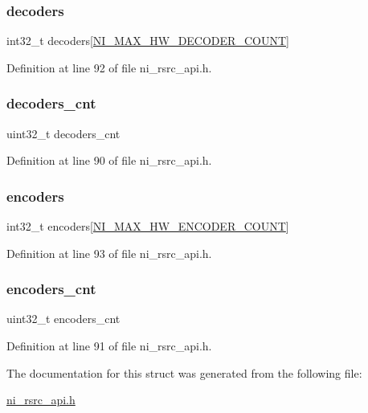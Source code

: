 \subsubsection{\texorpdfstring{decoders}{decoders}}
{\footnotesize\ttfamily int32\+\_\+t decoders\mbox{[}\mbox{\hyperlink{ni__rsrc__api_8h_aa1598022fc5ef313306c50f901940946}{N\+I\+\_\+\+M\+A\+X\+\_\+\+H\+W\+\_\+\+D\+E\+C\+O\+D\+E\+R\+\_\+\+C\+O\+U\+NT}}\mbox{]}}



Definition at line 92 of file ni\+\_\+rsrc\+\_\+api.\+h.

\mbox{\label{struct__ni__device__queue_a1f826fcc2c9c459b223b8eef43cbcfd7}} 
\subsubsection{\texorpdfstring{decoders\_cnt}{decoders\_cnt}}
{\footnotesize\ttfamily uint32\+\_\+t decoders\+\_\+cnt}



Definition at line 90 of file ni\+\_\+rsrc\+\_\+api.\+h.

\mbox{\label{struct__ni__device__queue_a4839ccd6286512d78250a3bad3a60832}} 
\subsubsection{\texorpdfstring{encoders}{encoders}}
{\footnotesize\ttfamily int32\+\_\+t encoders\mbox{[}\mbox{\hyperlink{ni__rsrc__api_8h_a41809901a12b4be816387878e15c69f3}{N\+I\+\_\+\+M\+A\+X\+\_\+\+H\+W\+\_\+\+E\+N\+C\+O\+D\+E\+R\+\_\+\+C\+O\+U\+NT}}\mbox{]}}



Definition at line 93 of file ni\+\_\+rsrc\+\_\+api.\+h.

\mbox{\label{struct__ni__device__queue_a12e8c3f68c9f36894d86db79a589b44b}} 
\subsubsection{\texorpdfstring{encoders\_cnt}{encoders\_cnt}}
{\footnotesize\ttfamily uint32\+\_\+t encoders\+\_\+cnt}



Definition at line 91 of file ni\+\_\+rsrc\+\_\+api.\+h.



The documentation for this struct was generated from the following file\+:\begin{DoxyCompactItemize}
\item 
\mbox{\hyperlink{ni__rsrc__api_8h}{ni\+\_\+rsrc\+\_\+api.\+h}}\end{DoxyCompactItemize}
